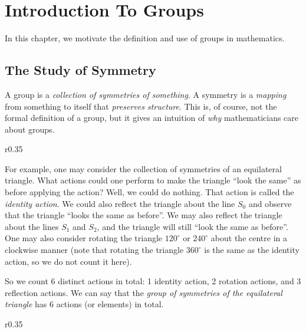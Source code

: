 \chapter{Introduction To Groups}
In this chapter, we motivate the definition and use of groups in mathematics.

\section{The Study of Symmetry}
A group is a \textit{collection of symmetries of something}. A symmetry is a \textit{mapping} from something to itself that \textit{preserves structure}. This is, of course, not the formal definition of a group, but it gives an intuition of \textit{why} mathematicians care about groups.

\begin{wrapfigure}{r}{0.35\textwidth}
    \centering
\end{wrapfigure}

For example, one may consider the collection of symmetries of an equilateral triangle. What actions could one perform to make the triangle ``look the same'' as before applying the action? Well, we could do nothing. That action is called the \textit{identity action}. We could also reflect the triangle about the line $S_0$ and observe that the triangle ``looks the same as before''. We may also reflect the triangle about the lines $S_1$ and $S_2$, and the triangle will still ``look the same as before''. One may also consider rotating the triangle $120^\circ$ or $240^\circ$ about the centre in a clockwise manner (note that rotating the triangle $360^\circ$ is the same as the identity action, so we do not count it here).

So we count 6 distinct actions in total: 1 identity action, 2 rotation actions, and 3 reflection actions. We can say that the \textit{group of symmetries of the equilateral triangle} has 6 actions (or elements) in total.

\begin{wrapfigure}{r}{0.35\textwidth}
    \centering
\end{wrapfigure}

